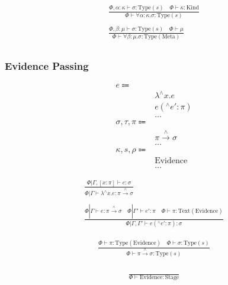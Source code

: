 \documentclass {article}
\begin{document}
\begin{gather*}
\frac
{\Phi, \alpha : \kappa \vdash \sigma : \text{Type}(s) \quad \Phi \vdash \kappa : \text{Kind}}
{\Phi \vdash \forall \alpha : \kappa. \sigma : \text{Type} (s) } \\
\\
\frac
{\Phi, \beta : \mu \vdash \sigma : \text{Type} (s) \quad \Phi \vdash \mu  }
{\Phi \vdash \forall \beta : \mu. \sigma : \text{Type} (\text{Meta}) } \\
\end{gather*}

\subsubsection{Evidence Passing}
\begin{align*}
e \Coloneqq & \\
& \lambda^\wedge x. e \tag{Evidence Lambda} \\
& e (^\wedge e' : \pi) \tag{Evidence Application} \\
& \dots \\
\sigma, \tau, \pi \Coloneqq & \\
& \pi \xrightarrow{\wedge} \sigma \tag{Evidence Function} \\
& \dots \\
\kappa, s, \rho \Coloneqq & \\
& \text{Evidence} \tag{Evidence Stage} \\
& \dots
\end{align*}

\begin{gather*}
\frac
{\Phi | \Gamma, [x : \pi] \vdash e : \sigma}
{\Phi | \Gamma \vdash \lambda^\wedge x. e : \pi \xrightarrow{\wedge} \sigma} \\
\\
\frac
{\Phi | \Gamma \vdash e : \pi \xrightarrow{\wedge} \sigma \quad \Phi | \Gamma' \vdash e': \pi  \quad \Phi \vdash \pi : \text{Text}(\text{Evidence})}
{\Phi | \Gamma, \Gamma' \vdash e (^\wedge e' : \pi) : \sigma}
\end{gather*}

\begin{gather*}
\frac
{\Phi \vdash \pi : \text{Type}(\text{Evidence}) \quad \Phi \vdash \sigma : \text{Type}(s)}
{\Phi \vdash \pi \xrightarrow{\wedge} \sigma : \text{Type}(s)} \\
\end{gather*}

\begin{gather*}
\frac
{}
{\Phi \vdash \text{Evidence} : \text{Stage}} \\
\end{gather*}
\end{document}

